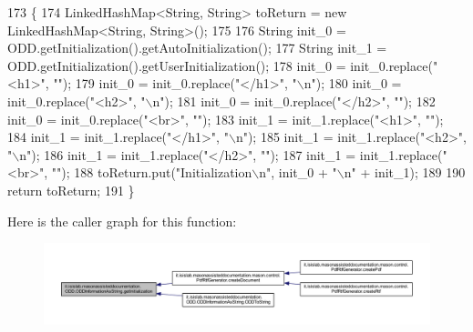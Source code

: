 \begin{DoxyCode}
173                                                                    \{
174         LinkedHashMap<String, String> toReturn = \textcolor{keyword}{new} LinkedHashMap<String, String>();
175 
176         String init\_0 = ODD.getInitialization().getAutoInitialization();
177         String init\_1 = ODD.getInitialization().getUserInitialization();
178         init\_0 = init\_0.replace(\textcolor{stringliteral}{"<h1>"}, \textcolor{stringliteral}{""});
179         init\_0 = init\_0.replace(\textcolor{stringliteral}{"</h1>"}, \textcolor{stringliteral}{"\(\backslash\)n"});
180         init\_0 = init\_0.replace(\textcolor{stringliteral}{"<h2>"}, \textcolor{stringliteral}{"\(\backslash\)n"});
181         init\_0 = init\_0.replace(\textcolor{stringliteral}{"</h2>"}, \textcolor{stringliteral}{""});
182         init\_0 = init\_0.replace(\textcolor{stringliteral}{"<br>"}, \textcolor{stringliteral}{""});
183         init\_1 = init\_1.replace(\textcolor{stringliteral}{"<h1>"}, \textcolor{stringliteral}{""});
184         init\_1 = init\_1.replace(\textcolor{stringliteral}{"</h1>"}, \textcolor{stringliteral}{"\(\backslash\)n"});
185         init\_1 = init\_1.replace(\textcolor{stringliteral}{"<h2>"}, \textcolor{stringliteral}{"\(\backslash\)n"});
186         init\_1 = init\_1.replace(\textcolor{stringliteral}{"</h2>"}, \textcolor{stringliteral}{""});
187         init\_1 = init\_1.replace(\textcolor{stringliteral}{"<br>"}, \textcolor{stringliteral}{""});
188         toReturn.put(\textcolor{stringliteral}{"Initialization\(\backslash\)n"}, init\_0 + \textcolor{stringliteral}{"\(\backslash\)n"} + init\_1);
189         
190         \textcolor{keywordflow}{return} toReturn;
191     \}
\end{DoxyCode}


Here is the caller graph for this function\-:
\nopagebreak
\begin{figure}[H]
\begin{center}
\leavevmode
\includegraphics[width=350pt]{classit_1_1isislab_1_1masonassisteddocumentation_1_1_o_d_d_1_1_o_d_d_information_as_string_aa3767e51964fecba08ec6e1669b77691_icgraph}
\end{center}
\end{figure}


